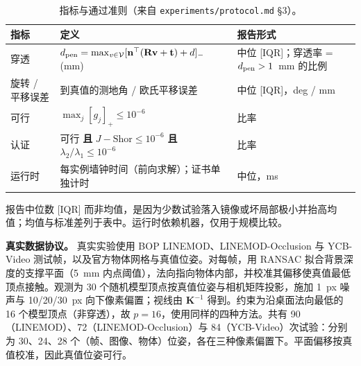 \begin{table}[H]
\centering
\caption{指标与通过准则（来自 \texttt{experiments/protocol.md} \S3）。}
\label{tab:app_metrics}
\scriptsize
\setlength{\tabcolsep}{3pt}
\begin{tabular}{@{}p{1.55cm}p{3.6cm}p{2.0cm}@{}}
\toprule
指标 & 定义 & 报告形式 \\
\midrule
穿透 & $d_{\rm pen}=\max_{v\in\mathcal V}[\mathbf n^\top(\mathbf R\mathbf v+\mathbf t)+d]_-$ (mm) & 中位 [IQR]；穿透率 = $d_{\rm pen}>1$~mm 的比例 \\
旋转 / 平移误差 & 到真值的测地角 / 欧氏平移误差 & 中位 [IQR]，deg / mm \\
可行 & $\max_j[g_j]_+\le10^{-6}$ & 比率 \\
认证 & 可行 \textbf{且} $J-\mathrm{Shor}\le10^{-6}$ \textbf{且} $\lambda_2/\lambda_1\le10^{-6}$ & 比率 \\
运行时 & 每实例墙钟时间（前向求解）；证书单独计时 & 中位，ms \\
\bottomrule
\end{tabular}
\end{table}

报告中位数 [IQR] 而非均值，是因为少数试验落入镜像或坏局部极小并抬高均值；均值与标准差列于表中。运行时依赖机器，仅用于规模比较。

\textbf{真实数据协议。} 真实实验使用 BOP LINEMOD、LINEMOD-Occlusion 与 YCB-Video 测试帧，以及官方物体网格与真值位姿。对每帧，用 RANSAC 拟合背景深度的支撑平面（5~mm 内点阈值），法向指向物体内部，并校准其偏移使真值最低顶点接触。观测为 30 个随机模型顶点按真值位姿与相机矩阵投影，施加 1~px 噪声与 10/20/30~px 向下像素偏置；视线由 $\mathbf K^{-1}$ 得到。约束为沿桌面法向最低的 16 个模型顶点（非穿透），故 $p=16$，使用同样的四种方法。共有 90（LINEMOD）、72（LINEMOD-Occlusion）与 84（YCB-Video）次试验：分别为 30、24、28 个（帧、图像、物体）位姿，各在三种像素偏置下。平面偏移按真值校准，因此真值位姿可行。



